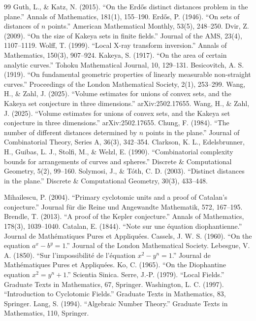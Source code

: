 \begin{thebibliography}{99}
 Guth, L., \& Katz, N. (2015). ``On the Erdős distinct distances problem in the plane.'' Annals of Mathematics, 181(1), 155--190.
 Erdős, P. (1946). ``On sets of distances of $n$ points.'' American Mathematical Monthly, 53(5), 248--250.
 Dvir, Z. (2009). ``On the size of Kakeya sets in finite fields.'' Journal of the AMS, 23(4), 1107--1119.
 Wolff, T. (1999). ``Local X-ray transform inversion.'' Annals of Mathematics, 150(3), 907--924.
 Kakeya, S. (1917). ``On the area of certain analytic curves.'' Tohoku Mathematical Journal, 10, 129--131.
 Besicovitch, A. S. (1919). ``On fundamental geometric properties of linearly measurable non-straight curves.'' Proceedings of the London Mathematical Society, 2(1), 253--299.
 Wang, H., \& Zahl, J. (2025). ``Volume estimates for unions of convex sets, and the Kakeya set conjecture in three dimensions.'' arXiv:2502.17655.
 Wang, H., \& Zahl, J. (2025). ``Volume estimates for unions of convex sets, and the Kakeya set conjecture in three dimensions.'' arXiv:2502.17655.
 Chung, F. (1984). ``The number of different distances determined by $n$ points in the plane.'' Journal of Combinatorial Theory, Series A, 36(3), 342--354.
 Clarkson, K. L., Edelsbrunner, H., Guibas, L. J., Stolfi, M., \& Welzl, E. (1990). ``Combinatorial complexity bounds for arrangements of curves and spheres.'' Discrete \& Computational Geometry, 5(2), 99--160.
 Solymosi, J., \& Tóth, C. D. (2003). ``Distinct distances in the plane.'' Discrete \& Computational Geometry, 30(3), 433--448.

 Mihailescu, P. (2004). ``Primary cyclotomic units and a proof of Catalan's conjecture.'' Journal für die Reine und Angewandte Mathematik, 572, 167--195.
 Brendle, T. (2013). ``A proof of the Kepler conjecture.'' Annals of Mathematics, 178(3), 1039--1040.
 Catalan, E. (1844). ``Note sur une équation diophantienne.'' Journal de Mathématiques Pures et Appliquées.
 Cassels, J. W. S. (1960). ``On the equation $a^x - b^y = 1$.'' Journal of the London Mathematical Society.
 Lebesgue, V. A. (1850). ``Sur l'impossibilité de l'équation $x^2 - y^n = 1$.'' Journal de Mathématiques Pures et Appliquées.
 Ko, C. (1965). ``On the Diophantine equation $x^2 = y^n + 1$.'' Scientia Sinica.
 Serre, J.-P. (1979). ``Local Fields.'' Graduate Texts in Mathematics, 67, Springer.
 Washington, L. C. (1997). ``Introduction to Cyclotomic Fields.'' Graduate Texts in Mathematics, 83, Springer.
 Lang, S. (1994). ``Algebraic Number Theory.'' Graduate Texts in Mathematics, 110, Springer.


\end{thebibliography}
